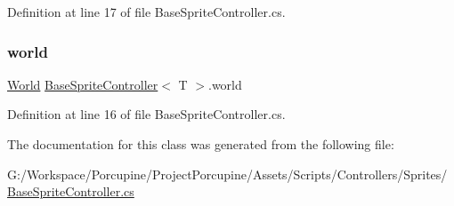 Definition at line 17 of file Base\+Sprite\+Controller.\+cs.

\mbox{\label{class_base_sprite_controller_a593ea6a31165eff51a0acffc12ea65ca}} 
\subsubsection{\texorpdfstring{world}{world}}
{\footnotesize\ttfamily \hyperlink{class_world}{World} \hyperlink{class_base_sprite_controller}{Base\+Sprite\+Controller}$<$ T $>$.world\hspace{0.3cm}{\ttfamily [protected]}}



Definition at line 16 of file Base\+Sprite\+Controller.\+cs.



The documentation for this class was generated from the following file\+:\begin{DoxyCompactItemize}
\item 
G\+:/\+Workspace/\+Porcupine/\+Project\+Porcupine/\+Assets/\+Scripts/\+Controllers/\+Sprites/\hyperlink{_base_sprite_controller_8cs}{Base\+Sprite\+Controller.\+cs}\end{DoxyCompactItemize}
